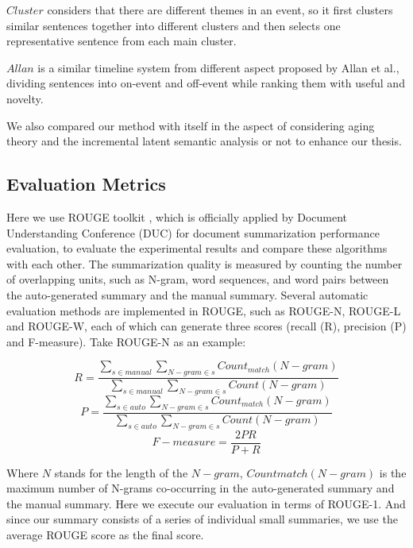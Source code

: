 \documentclass[runningheads,a4paper]{llncs}
\begin{document}
$Cluster$ considers that there are different themes in an event, so it first clusters similar sentences together into different clusters and then selects one representative sentence from each main cluster.

$Allan$ is a similar timeline system from different aspect proposed by Allan et al., dividing sentences into on-event and off-event while ranking them with useful and novelty.

We also compared our method with itself in the aspect of considering aging theory and the incremental latent semantic analysis or not to enhance our thesis.

\subsection{Evaluation Metrics}
Here we use ROUGE toolkit \cite{2004-Lin-p74-81} , which is officially applied by Document Understanding Conference (DUC) for document summarization performance evaluation, to evaluate the experimental results and compare these algorithms with each other. The summarization quality is measured by counting the number of overlapping units, such as N-gram, word sequences, and word pairs between the auto-generated summary and the manual summary. Several automatic evaluation methods are implemented in ROUGE, such as ROUGE-N, ROUGE-L and ROUGE-W, each of which can generate three scores (recall (R), precision (P) and F-measure). Take ROUGE-N as an example:

\begin{equation}
R=\frac{\sum_{s \in manual } \sum_{N-gram \in s} Count_{match}(N-gram) } { \sum_{s \in manual} \sum_{N-gram \in s} Count(N-gram)  } \end{equation}
\begin{equation}
P=\frac{\sum_{s \in auto } \sum_{N-gram \in s} Count_{match}(N-gram) } { \sum_{s \in auto} \sum_{N-gram \in s} Count(N-gram)  }
\end{equation}
\begin{equation}
F-measure = \frac{2PR}{P+R}
\end{equation}

Where $N$ stands for the length of the $N-gram$, $Countmatch(N-gram)$ is the maximum number of N-grams co-occurring in the auto-generated summary and the manual summary. Here we execute our evaluation in terms of ROUGE-1. And since our summary consists of a series of individual small summaries, we use the average ROUGE score as the final score.
\end{document}

